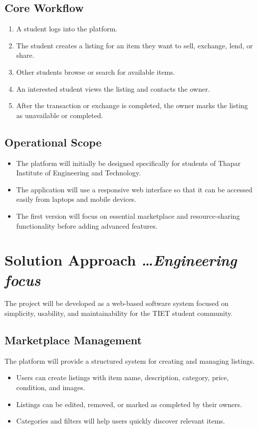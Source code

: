 \documentclass[11pt,a4paper]{article}
\newcommand{\BvrHint}[1]{%
  {\normalfont\normalsize\itshape\hfill #1}}
\begin{document}
\subsection{Core Workflow}
\begin{enumerate}[leftmargin=0.7cm]
    \item A student logs into the platform.
    \item The student creates a listing for an item they want to sell, exchange, lend, or share.
    \item Other students browse or search for available items.
    \item An interested student views the listing and contacts the owner.
    \item After the transaction or exchange is completed, the owner marks the listing as unavailable or completed.
\end{enumerate}

\subsection{Operational Scope}
\begin{itemize}[leftmargin=0.7cm]
    \item The platform will initially be designed specifically for students of Thapar Institute of Engineering and Technology.
    \item The application will use a responsive web interface so that it can be accessed easily from laptops and mobile devices.
    \item The first version will focus on essential marketplace and resource-sharing functionality before adding advanced features.
\end{itemize}
\section{Solution Approach %
\BvrHint{\ldots Engineering focus}}

The project will be developed as a web-based software system focused on simplicity, usability, and maintainability for the TIET student community.

\subsection{Marketplace Management}
The platform will provide a structured system for creating and managing listings.
\begin{itemize}[leftmargin=0.7cm]
    \item Users can create listings with item name, description, category, price, condition, and images.
    \item Listings can be edited, removed, or marked as completed by their owners.
    \item Categories and filters will help users quickly discover relevant items.
\end{itemize}
\end{document}
